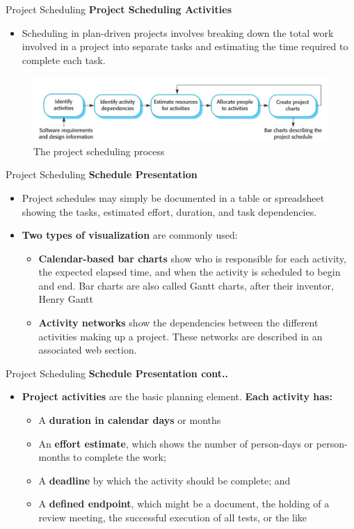 \documentclass{beamer}
\begin{document}
\begin{frame}{Project Scheduling}
	\textbf{Project Scheduling Activities}
	\begin{itemize}
		\item Scheduling in plan-driven projects involves breaking down the total work involved in a project into 
		separate tasks and estimating the time required to complete each task.
	\end{itemize}
	\begin{figure}
	\includegraphics[scale=.5]{img/m4_6}
	\caption{The project 
		scheduling process
	}
\end{figure}
\end{frame}
\begin{frame}{Project Scheduling}
	\textbf{Schedule Presentation}
	\begin{itemize}
		\item Project schedules may simply be documented in a table or spreadsheet showing the tasks, estimated 
		effort, duration, and task dependencies.
		\item \textbf{Two types of visualization} are commonly used:
		\begin{itemize}
			\item \textbf{Calendar-based bar charts} show who is responsible for each activity, the expected elapsed time, 
			and when the activity is scheduled to begin and end. Bar charts are also called Gantt charts, 
			after their inventor, Henry Gantt
			\item \textbf{Activity networks} show the dependencies between the different activities making up a project. 
			These networks are described in an associated web section.
		\end{itemize}
	\end{itemize}
\end{frame}
\begin{frame}{Project Scheduling}
	\textbf{Schedule Presentation cont..}
	\begin{itemize}
		\item \textbf{Project activities} are the basic planning element. \textbf{Each activity has:}
		\begin{itemize}
			\item A \textbf{duration in calendar days} or months
			\item An \textbf{effort estimate}, which shows the number of person-days or person-months to complete the 
			work;
			\item A \textbf{deadline} by which the activity should be complete; and
			\item A \textbf{defined endpoint}, which might be a document, the holding of a review meeting, the 
			successful execution of all tests, or the like
		\end{itemize}
	\end{itemize}
\end{frame}
\end{document}
